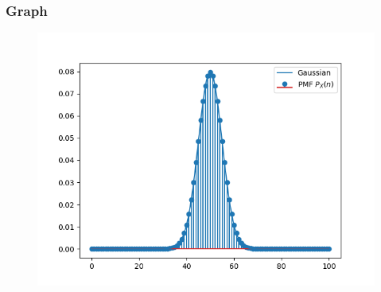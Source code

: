 \documentclass{beamer}
\theoremstyle{remark}
\numberwithin{equation}{section}
\begin{document}
      \begin{frame}[fragile]
        \frametitle{Graph}
        \begin{figure}[h!]
          \centering
          \includegraphics[width=1\columnwidth]{figs/pmf5.png}
          \label{stemplot}
        \end{figure}
      \end{frame}

    
\end{document}
